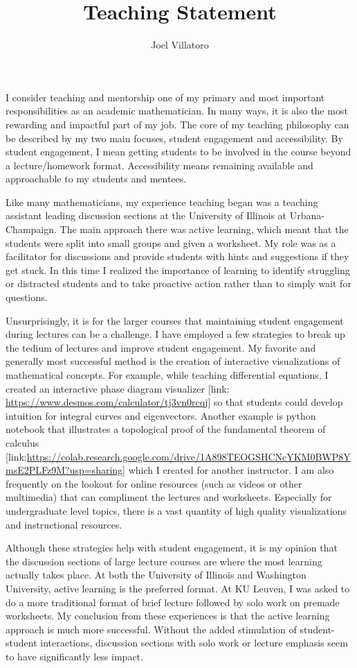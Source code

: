 \documentclass{article}
\title{Teaching Statement}
\author{Joel Villatoro}
\date{}
\begin{document}
\vspace{-0.5in}
\maketitle

I consider teaching and mentorship one of my primary and most important responsibilities as an academic mathematician. 
In many ways, it is also the most rewarding and impactful part of my job. 
The core of my teaching philosophy can be described by my two main focuses, student engagement and accessibility. 
By student engagement, I mean getting students to be involved in the course beyond a lecture/homework format. Accessibility means remaining available and approachable to my students and mentees.

Like many mathematicians, my experience teaching began was a teaching assistant leading discussion sections at the University of Illinois at Urbana-Champaign. The main approach there was active learning, which meant that the students were split into small groups and given a worksheet. My role was as a facilitator for discussions and provide students with hints and suggestions if they get stuck. In this time I realized the importance of learning to identify struggling or distracted students and to take proactive action rather than to simply wait for questions.

Unsurprisingly, it is for the larger courses that maintaining student engagement during lectures can be a challenge. 
I have employed a few strategies to break up the tedium of lectures and improve student engagement. My favorite and generally most successful method is the creation of interactive visualizations of mathematical concepts. For example, while teaching differential equations, I created an interactive phase diagram visualizer [link: \url{https://www.desmos.com/calculator/tj3vn0rcqj}] so that students could develop intuition for integral curves and eigenvectors. Another example is python notebook that illustrates a topological proof of the fundamental theorem of calculus [link:\url{https://colab.research.google.com/drive/1A898TEOGSHCNcYKM0BWP8YmsE2PLFz9M?usp=sharing}] which I created for another instructor. 
I am also frequently on the lookout for online resources (such as videos or other multimedia) that can compliment the lectures and worksheets. Especially for undergraduate level topics, there is a vast quantity of high quality visualizations and instructional resources.

Although these strategies help with student engagement, it is my opinion that the discussion sections of large lecture courses are where the most learning actually takes place. At both the University of Illinois and Washington University, active learning is the preferred format. At KU Leuven, I was asked to do a more traditional format of brief lecture followed by solo work on premade worksheets. My conclusion from these experiences is that the active learning approach is much more successful. Without the added stimulation of student-student interactions, discussion sections with solo work or lecture emphasis seem to have significantly less impact.
\end{document}
